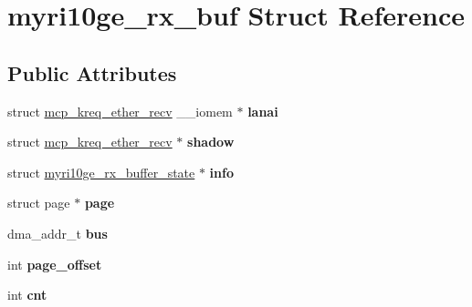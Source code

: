\hypertarget{structmyri10ge__rx__buf}{
\section{myri10ge\_\-rx\_\-buf Struct Reference}
\label{structmyri10ge__rx__buf}
}
\subsection*{Public Attributes}
\begin{DoxyCompactItemize}
\item 
\hypertarget{structmyri10ge__rx__buf_aaa6fffe4081e1330252a3642c4ca0523}{
struct \hyperlink{structmcp__kreq__ether__recv}{mcp\_\-kreq\_\-ether\_\-recv} \_\-\_\-iomem $\ast$ {\bfseries lanai}}
\label{structmyri10ge__rx__buf_aaa6fffe4081e1330252a3642c4ca0523}

\item 
\hypertarget{structmyri10ge__rx__buf_a77f3179c356e205def094285b7e41cb8}{
struct \hyperlink{structmcp__kreq__ether__recv}{mcp\_\-kreq\_\-ether\_\-recv} $\ast$ {\bfseries shadow}}
\label{structmyri10ge__rx__buf_a77f3179c356e205def094285b7e41cb8}

\item 
\hypertarget{structmyri10ge__rx__buf_ad8b9d7b58f074b5bbd0817beea610816}{
struct \hyperlink{structmyri10ge__rx__buffer__state}{myri10ge\_\-rx\_\-buffer\_\-state} $\ast$ {\bfseries info}}
\label{structmyri10ge__rx__buf_ad8b9d7b58f074b5bbd0817beea610816}

\item 
\hypertarget{structmyri10ge__rx__buf_a23d21b47c2bf185693e62f69e4c28f1a}{
struct page $\ast$ {\bfseries page}}
\label{structmyri10ge__rx__buf_a23d21b47c2bf185693e62f69e4c28f1a}

\item 
\hypertarget{structmyri10ge__rx__buf_a7f964a6e31ec7f892bfff3ae70c6ccdb}{
dma\_\-addr\_\-t {\bfseries bus}}
\label{structmyri10ge__rx__buf_a7f964a6e31ec7f892bfff3ae70c6ccdb}

\item 
\hypertarget{structmyri10ge__rx__buf_ad85e2abedc774efef730eb852985b427}{
int {\bfseries page\_\-offset}}
\label{structmyri10ge__rx__buf_ad85e2abedc774efef730eb852985b427}

\item 
\hypertarget{structmyri10ge__rx__buf_a2474a963e6cd036f365a5809a01f3d5e}{
int {\bfseries cnt}}
\label{structmyri10ge__rx__buf_a2474a963e6cd036f365a5809a01f3d5e}


\end{DoxyCompactItemize}
